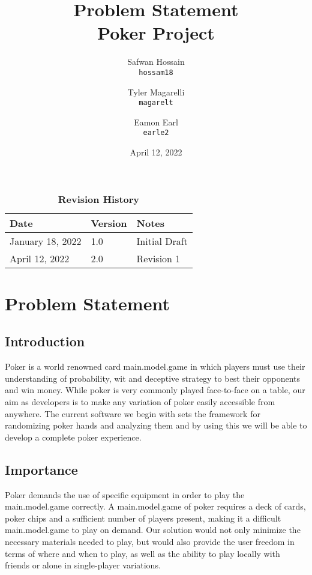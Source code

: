 \documentclass{article}
\title{Problem Statement \\ Poker Project}
\author{
  Safwan Hossain\\
  \texttt{hossam18}\\
  \and
  Tyler Magarelli\\
  \texttt{magarelt}\\
  \and
  Eamon Earl\\
  \texttt{earle2}
}
\date{April 12, 2022}
\begin{document}
\maketitle
\newpage

\begin{table}[bp]
\caption{\bf Revision History}
\begin{tabularx}{\textwidth}{p{3cm}p{2cm}X}
\toprule {\bf Date} & {\bf Version} & {\bf Notes}\\
\midrule
January 18, 2022 & 1.0 & Initial Draft\\
April 12, 2022 & 2.0 & Revision 1\\
\bottomrule
\end{tabularx}
\end{table}

\section*{Problem Statement}
\subsection*{Introduction}
    Poker is a world renowned card main.model.game in which players must use their understanding of probability, wit and deceptive strategy to best their opponents and win money. While poker is very commonly played face-to-face on a table, our aim as developers is to make any variation of poker easily accessible from anywhere. The current software we begin with sets the framework for randomizing poker hands and analyzing them and by using this we will be able to develop a complete poker experience.
\subsection*{Importance}
    Poker demands the use of specific equipment in order to play the main.model.game correctly. A main.model.game of poker requires a deck of cards, poker chips and a sufficient number of players present, making it a difficult main.model.game to play on demand. Our solution would not only minimize the necessary materials needed to play, but would also provide the user freedom in terms of where and when to play, as well as the ability to play locally with friends or alone in single-player variations.
\end{document}
